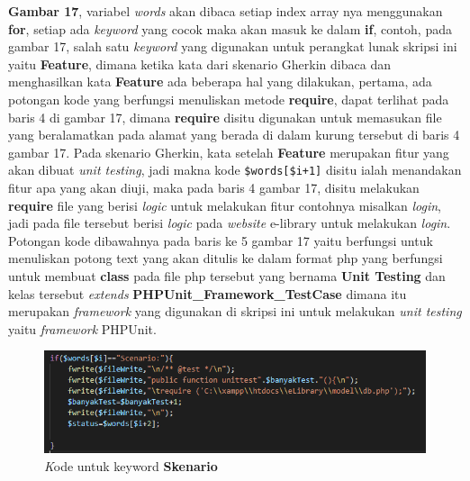 \documentclass[a4paper,twoside]{article}
\begin{document}
\begin{enumerate}
\textbf{Gambar 17}, variabel \textit{words} akan dibaca setiap index array nya menggunakan \textbf{for}, setiap ada \textit{keyword} yang cocok maka akan masuk ke dalam \textbf{if}, contoh, pada gambar 17, salah satu \textit{keyword} yang digunakan untuk perangkat lunak skripsi ini yaitu \textbf{Feature}, dimana ketika kata dari skenario Gherkin dibaca dan menghasilkan kata \textbf{Feature} ada beberapa hal yang dilakukan, pertama, ada potongan kode yang berfungsi menuliskan metode \textbf{require}, dapat terlihat pada baris 4 di gambar 17, dimana \textbf{require} disitu digunakan untuk memasukan file yang beralamatkan pada alamat yang berada di dalam kurung tersebut di baris 4 gambar 17. Pada skenario Gherkin, kata setelah \textbf{Feature} merupakan fitur yang akan dibuat \textit{unit testing}, jadi makna kode \texttt{\$words[\$i+1]} disitu ialah menandakan fitur apa yang akan diuji, maka pada baris 4 gambar 17, disitu melakukan \textbf{require} file yang berisi \textit{logic} untuk melakukan fitur contohnya misalkan \textit{login}, jadi pada file tersebut berisi \textit{logic} pada \textit{website} e-library untuk melakukan \textit{login}. Potongan kode dibawahnya pada baris ke 5 gambar 17 yaitu berfungsi untuk menuliskan potong text yang akan ditulis ke dalam format php yang berfungsi untuk membuat \textbf{class} pada file php tersebut yang bernama \textbf{Unit Testing} dan kelas tersebut \textit{extends} \textbf{PHPUnit\_Framework\_TestCase} dimana itu merupakan \textit{framework} yang digunakan di skripsi ini untuk melakukan \textit{unit testing} yaitu \textit{framework} PHPUnit.

\begin{figure}[h!]
			\includegraphics[scale=1.00]{../DokumenSkripsi/gambar/implementasi7}
			\centering
			\caption{\textit Kode untuk keyword \textbf{Skenario}}
		\end{figure}


\end{enumerate}
\end{document}
